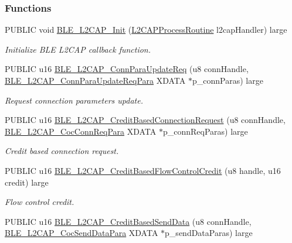 \subsubsection*{Functions}
\begin{DoxyCompactItemize}
\item 
P\+U\+B\+L\+IC void \hyperlink{group___b_l_e___l2_c_a_p_ga9071de0e0e0337a60aa85ac2276008a9}{B\+L\+E\+\_\+\+L2\+C\+A\+P\+\_\+\+Init} (\hyperlink{group___b_l_e___l2_c_a_p_ga44ae8ada620cff0635a1173bcb4df6a5}{L2\+C\+A\+P\+Process\+Routine} l2cap\+Handler) large
\begin{DoxyCompactList}\small\item\em Initialize B\+LE L2\+C\+AP callback function. \end{DoxyCompactList}\item 
P\+U\+B\+L\+IC u16 \hyperlink{group___b_l_e___l2_c_a_p_gaab5e507ef07c679f897a05017ab0b869}{B\+L\+E\+\_\+\+L2\+C\+A\+P\+\_\+\+Conn\+Para\+Update\+Req} (u8 conn\+Handle, \hyperlink{struct_b_l_e___l2_c_a_p___conn_para_update_req_para}{B\+L\+E\+\_\+\+L2\+C\+A\+P\+\_\+\+Conn\+Para\+Update\+Req\+Para} X\+D\+A\+TA $\ast$p\+\_\+conn\+Paras) large
\begin{DoxyCompactList}\small\item\em Request connection parameters update. \end{DoxyCompactList}\item 
P\+U\+B\+L\+IC u16 \hyperlink{group___b_l_e___l2_c_a_p_ga76f7ee8bd26d3fa9530f111779e13a7d}{B\+L\+E\+\_\+\+L2\+C\+A\+P\+\_\+\+Credit\+Based\+Connection\+Request} (u8 conn\+Handle, \hyperlink{struct_b_l_e___l2_c_a_p___coc_conn_req_para}{B\+L\+E\+\_\+\+L2\+C\+A\+P\+\_\+\+Coc\+Conn\+Req\+Para} X\+D\+A\+TA $\ast$p\+\_\+conn\+Req\+Paras) large
\begin{DoxyCompactList}\small\item\em Credit based connection request. \end{DoxyCompactList}\item 
P\+U\+B\+L\+IC u16 \hyperlink{group___b_l_e___l2_c_a_p_ga48afdf8f3b4c1e2429d41eac3c6e4998}{B\+L\+E\+\_\+\+L2\+C\+A\+P\+\_\+\+Credit\+Based\+Flow\+Control\+Credit} (u8 handle, u16 credit) large
\begin{DoxyCompactList}\small\item\em Flow control credit. \end{DoxyCompactList}\item 
P\+U\+B\+L\+IC u16 \hyperlink{group___b_l_e___l2_c_a_p_gae04c6ebd68632aab72b3c904f260cf28}{B\+L\+E\+\_\+\+L2\+C\+A\+P\+\_\+\+Credit\+Based\+Send\+Data} (u8 conn\+Handle, \hyperlink{struct_b_l_e___l2_c_a_p___coc_send_data_para}{B\+L\+E\+\_\+\+L2\+C\+A\+P\+\_\+\+Coc\+Send\+Data\+Para} X\+D\+A\+TA $\ast$p\+\_\+send\+Data\+Paras) large

\end{DoxyCompactItemize}
